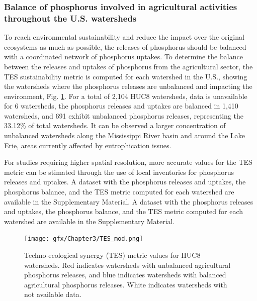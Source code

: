 \begin{refsection}[referencesCh3]
\subsubsection{Balance of phosphorus involved in agricultural activities throughout the U.S. watersheds}
To reach environmental sustainability and reduce the impact over the original ecosystems as much as possible, the releases of phosphorus should be balanced with a coordinated network of phosphorus uptakes. To determine the balance between the releases and uptakes of phosphorus from the agricultural sector, the TES sustainability metric is computed for each watershed in the U.S., showing the watersheds where the phosphorus releases are unbalanced and impacting the environment, Fig. \ref{fig:TES}. For a total of 2,104 HUC8 watersheds, data is unavailable for 6 watersheds, the phosphorus releases and uptakes are balanced in 1,410 watersheds, and 691 exhibit unbalanced phosphorus releases, representing the 33.12\% of total watersheds. It can be observed a larger concentration of unbalanced watersheds along the Mississippi River basin and around the Lake Erie, areas currently affected by eutrophication issues. 

For studies requiring higher spatial resolution, more accurate values for the TES metric can be stimated through the use of local inventories for phosphorus releases and uptakes. A dataset with the phosphorus releases and uptakes, the phosphorus balance, and the TES metric computed for each watershed are available in the Supplementary Material. A dataset with the phosphorus releases and uptakes, the phosphorus balance, and the TES metric computed for each watershed are available in the Supplementary Material.

\begin{figure}[h!] 
	\begin{adjustwidth}{}{}
		\centering
		\texttt{[image: gfx/Chapter3/TES\_mod.png]} 
		\caption{Techno-ecological synergy (TES) metric values for HUC8 watersheds. Red indicates watersheds with unbalanced agricultural phosphorus releases, and blue indicates watersheds with balanced agricultural phosphorus releases. White indicates watersheds with not available data.} 
		\label{fig:TES}
	\end{adjustwidth}{}
\end{figure}


\end{refsection}
